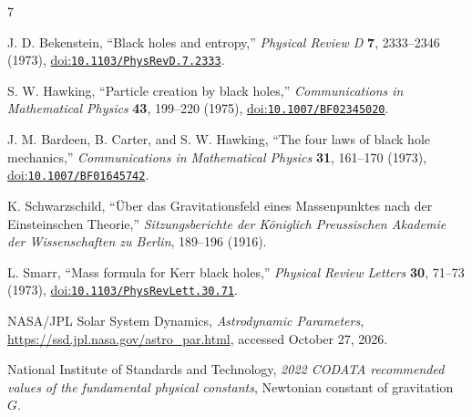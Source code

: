 \documentclass[12pt]{article}
\begin{document}
\begin{thebibliography}{7}
\small
{}
\raggedright
{}

J. D. Bekenstein,
``Black holes and entropy,''
\emph{Physical Review D} \textbf{7}, 2333--2346 (1973),
\href{https://doi.org/10.1103/PhysRevD.7.2333}{doi:\nolinkurl{10.1103/PhysRevD.7.2333}}.

S. W. Hawking,
``Particle creation by black holes,''
\emph{Communications in Mathematical Physics} \textbf{43}, 199--220 (1975),
\href{https://doi.org/10.1007/BF02345020}{doi:\nolinkurl{10.1007/BF02345020}}.

J. M. Bardeen, B. Carter, and S. W. Hawking,
``The four laws of black hole mechanics,''
\emph{Communications in Mathematical Physics} \textbf{31}, 161--170 (1973),
\href{https://doi.org/10.1007/BF01645742}{doi:\nolinkurl{10.1007/BF01645742}}.

K. Schwarzschild,
``\"Uber das Gravitationsfeld eines Massenpunktes nach der Einsteinschen Theorie,''
\emph{Sitzungsberichte der K\"oniglich Preussischen Akademie der Wissenschaften zu Berlin}, 189--196 (1916).

L. Smarr,
``Mass formula for Kerr black holes,''
\emph{Physical Review Letters} \textbf{30}, 71--73 (1973),
\href{https://doi.org/10.1103/PhysRevLett.30.71}{doi:\nolinkurl{10.1103/PhysRevLett.30.71}}.

NASA/JPL Solar System Dynamics,
\emph{Astrodynamic Parameters},
\url{https://ssd.jpl.nasa.gov/astro_par.html},
accessed October 27, 2026.

National Institute of Standards and Technology,
\emph{2022 CODATA recommended values of the fundamental physical constants},
Newtonian constant of gravitation $G$.
\end{thebibliography}
\end{document}
